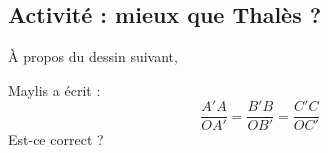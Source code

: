 
\subsection*{Activité : mieux que Thalès ?}

À propos du dessin suivant,
\begin{center}
   
\end{center}
Maylis a écrit :
\begin{equation}
    \frac{ A'A }{ OA' }=\frac{ B'B }{ OB' }=\frac{ C'C }{ OC' }
\end{equation}
Est-ce correct ?
